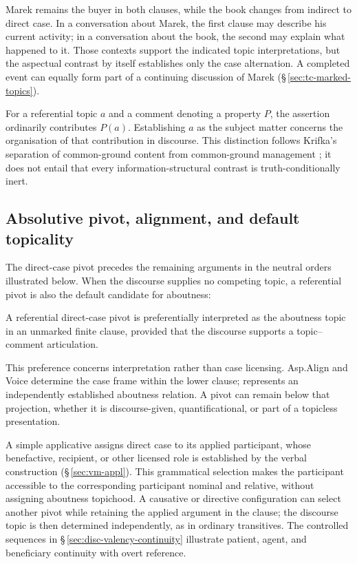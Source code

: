 \noindent Marek remains the buyer in both clauses, while the book changes
 from indirect to direct case. In a conversation about Marek, the first clause
 may describe his current activity; in a conversation about the book, the
 second may explain what happened to it. Those contexts support the indicated
 topic interpretations, but the aspectual contrast by itself establishes only
 the case alternation. A completed event can equally form part of a continuing
 discussion of Marek (§\,\ref{sec:tc-marked-topics}).

For a referential topic $a$ and a comment denoting a property $P$, the assertion
 ordinarily contributes $P(a)$. Establishing $a$ as the subject matter concerns
 the organisation of that contribution in discourse. This distinction follows
 Krifka's separation of common-ground content from common-ground management
 \cite[§\,2.2]{krifka2008}; it does not entail that every information-structural
 contrast is truth-conditionally inert.

\subsection{Absolutive pivot, alignment, and default topicality}
\label{sec:tc-abs-align}

The direct-case pivot precedes the remaining arguments in the neutral orders
 illustrated below. When the discourse supplies no competing topic, a
 referential pivot is also the default candidate for aboutness:

\begin{description}[leftmargin=2em, labelwidth=!, labelindent=0em]
\item[\upshape Absolutive--Topic Alignment:] A referential direct-case pivot
 is preferentially interpreted as the aboutness topic in an unmarked finite
 clause, provided that the discourse supports a topic--comment articulation.
\end{description}

\noindent This preference concerns interpretation rather than case licensing.
 Asp.Align and Voice determine the case frame within the lower clause;
  represents an independently established aboutness relation.
 A pivot can remain below that projection, whether it is discourse-given,
 quantificational, or part of a topicless presentation.

A simple applicative assigns direct case to its applied participant, whose
benefactive, recipient, or other licensed role is established by the verbal
construction (§\,\ref{sec:vm-appl}). This grammatical selection makes the
participant accessible to the corresponding participant nominal and relative,
without assigning aboutness topichood. A causative or directive configuration
can select another pivot while retaining the applied argument in the clause;
the discourse topic is then determined independently, as in ordinary
transitives. The controlled sequences in §\,\ref{sec:disc-valency-continuity}
illustrate patient, agent, and beneficiary continuity with overt reference.

